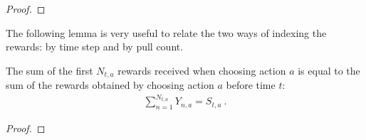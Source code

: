 \begin{proof}\leanok

\end{proof}


The following lemma is very useful to relate the two ways of indexing the rewards: by time step and by pull count.

\begin{lemma}\label{lem:sum_rewardByCount}
  \leanok
The sum of the first $N_{t, a}$ rewards received when choosing action $a$ is equal to the sum of the rewards obtained by choosing action $a$ before time $t$:
\begin{align*}
  \sum_{n=1}^{N_{t, a}} Y_{n, a} = S_{t,a}
  \: .
\end{align*}
\end{lemma}

\begin{proof}\leanok

\end{proof}
